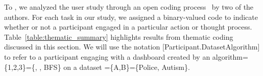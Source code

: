 To ,
we analyzed the user study 
through an open coding process~\cite{Muller1993} by two of the authors.
For each task in our study, we assigned a binary-valued code to indicate whether or not a participant engaged in a particular action or thought process. Table~\ref{table:thematic_summary} highlights results from thematic coding discussed in this section. We will use the notation [Participant.DatasetAlgorithm] to refer to a participant engaging with a dashboard created by an algorithm=\{1,2,3\}=\{\system, \cluster, \textsc{BFS}\} on a dataset =\{A,B\}=\{Police, Autism\}.
